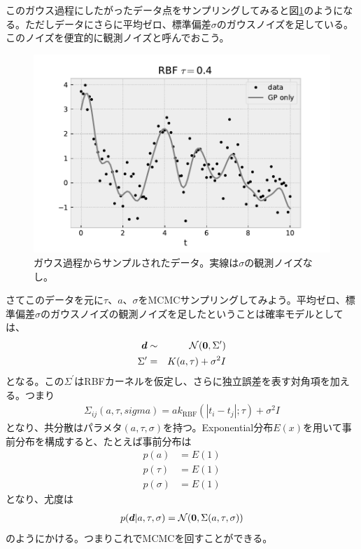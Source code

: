 このガウス過程にしたがったデータ点をサンプリングしてみると図\ref{fig:gp1}のようになる。ただしデータにさらに平均ゼロ、標準偏差$\sigma$のガウスノイズを足している。このノイズを便宜的に観測ノイズと呼んでおこう。
\begin{figure}[htb]
\begin{center}
\includegraphics[width=\linewidth]{fig/gp/gp1.pdf}
\caption{ガウス過程からサンプルされたデータ。実線は$\sigma$の観測ノイズなし。\label{fig:gp1}}
\end{center}
\end{figure}



さてこのデータを元に$\tau$、$a$、$\sigma$をMCMCサンプリングしてみよう。平均ゼロ、標準偏差$\sigma$のガウスノイズの観測ノイズを足したということは確率モデルとしては、
\begin{eqnarray}
\label{eq:gpmodel0}
\boldsymbol{d} &\sim& \mathcal{N}(\boldsymbol{0},\Sigma^\prime ) \\
\Sigma^\prime &=& K(a, \tau) + \sigma^2 I
\end{eqnarray}
となる。この$\Sigma^\prime$はRBFカーネルを仮定し、さらに独立誤差を表す対角項を加える。つまり
\begin{align}
 \Sigma_{ij} (a, \tau, sigma) = a k_\mathrm{RBF} (|t_i - t_j|; \tau) + \sigma^2 I
\end{align}
となり、共分散はパラメタ$(a, \tau, \sigma)$を持つ。Exponential分布$E(x)$を用いて事前分布を構成すると、たとえば事前分布は
\begin{align}
    p(a) &= E(1) \\
    p(\tau) &= E(1) \\
    p(\sigma) &= E(1) 
\end{align}
となり、尤度は
\begin{align}
    p(\boldsymbol{d}|a, \tau, \sigma) = \mathcal{N}(\boldsymbol{0},  \Sigma (a, \tau, \sigma) )
\end{align}
のようにかける。つまりこれでMCMCを回すことができる。


